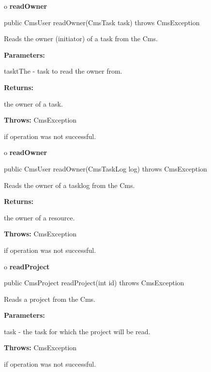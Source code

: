 o {\bf readOwner} 

\begin{PRE}
 public CmsUser readOwner(CmsTask task) throws CmsException
\end{PRE}

\begin{description}
\htmlDD Reads the owner (initiator) of a task from the Cms. 

\begin{description}
\item {\bf Parameters:}  

tasktThe - task to read the owner from.  
\item {\bf Returns:}  

the owner of a task.  
\item {\bf Throws:} CmsException  

if operation was not successful.  
\end{description}

\end{description}

o {\bf readOwner} 

\begin{PRE}
 public CmsUser readOwner(CmsTaskLog log) throws CmsException
\end{PRE}

\begin{description}
\htmlDD Reads the owner of a tasklog from the Cms. 

\begin{description}
\item {\bf Returns:}  

the owner of a resource.  
\item {\bf Throws:} CmsException  

if operation was not successful.  
\end{description}

\end{description}

o {\bf readProject} 

\begin{PRE}
 public CmsProject readProject(int id) throws CmsException
\end{PRE}

\begin{description}
\htmlDD Reads a project from the Cms. 

\begin{description}
\item {\bf Parameters:}  

task - the task for which the project will be read.  
\item {\bf Throws:} CmsException  

if operation was not successful.  
\end{description}

\end{description}

